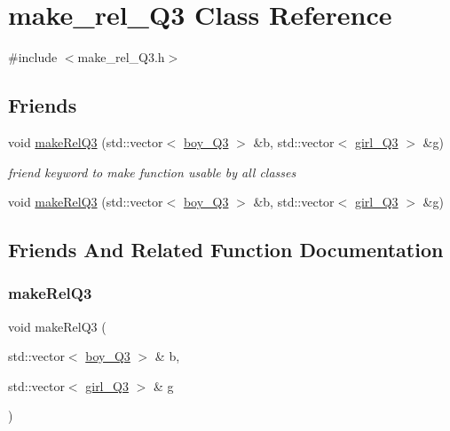 \hypertarget{classmake__rel___q3}{}\section{make\+\_\+rel\+\_\+\+Q3 Class Reference}
\label{classmake__rel___q3}


{\ttfamily \#include $<$make\+\_\+rel\+\_\+\+Q3.\+h$>$}

\subsection*{Friends}
\begin{DoxyCompactItemize}
\item 
void \hyperlink{classmake__rel___q3_a209f34f3ac506a757a78c54e6c0e300a}{make\+Rel\+Q3} (std\+::vector$<$ \hyperlink{classboy___q3}{boy\+\_\+\+Q3} $>$ \&b, std\+::vector$<$ \hyperlink{classgirl___q3}{girl\+\_\+\+Q3} $>$ \&g)
\begin{DoxyCompactList}\small\item\em friend keyword to make function usable by all classes \end{DoxyCompactList}\item 
void \hyperlink{classmake__rel___q3_a209f34f3ac506a757a78c54e6c0e300a}{make\+Rel\+Q3} (std\+::vector$<$ \hyperlink{classboy___q3}{boy\+\_\+\+Q3} $>$ \&b, std\+::vector$<$ \hyperlink{classgirl___q3}{girl\+\_\+\+Q3} $>$ \&g)
\end{DoxyCompactItemize}


\subsection{Friends And Related Function Documentation}
\mbox{\label{classmake__rel___q3_a209f34f3ac506a757a78c54e6c0e300a}} 
\subsubsection{\texorpdfstring{make\+Rel\+Q3}{makeRelQ3}\hspace{0.1cm}{\footnotesize\ttfamily [1/2]}}
{\footnotesize\ttfamily void make\+Rel\+Q3 (\begin{DoxyParamCaption}\item[{std\+::vector$<$ \hyperlink{classboy___q3}{boy\+\_\+\+Q3} $>$ \&}]{b,  }\item[{std\+::vector$<$ \hyperlink{classgirl___q3}{girl\+\_\+\+Q3} $>$ \&}]{g }\end{DoxyParamCaption})\hspace{0.3cm}{\ttfamily [friend]}}



